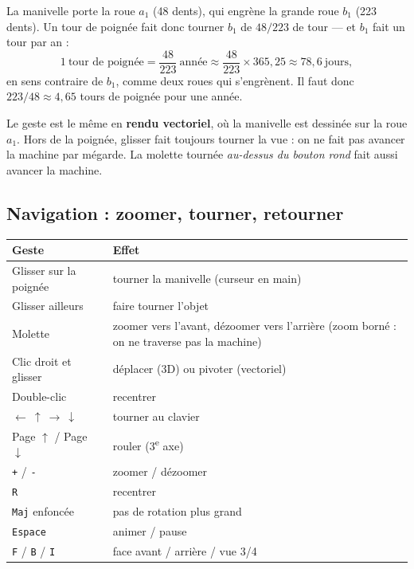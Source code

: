 \documentclass[a4paper,11pt]{article}
\begin{document}
\begin{info}
La manivelle porte la roue $a_1$ (48 dents), qui engrène la grande roue $b_1$
(223 dents). Un tour de poignée fait donc tourner $b_1$ de $48/223$ de tour —
et $b_1$ fait un tour par an :
\[
  1~\text{tour de poignée} = \frac{48}{223}~\text{année}
  \approx \frac{48}{223}\times 365{,}25 \approx 78{,}6~\text{jours},
\]
en sens contraire de $b_1$, comme deux roues qui s'engrènent. Il faut donc
$223/48 \approx 4{,}65$ tours de poignée pour une année.
\end{info}

Le geste est le même en \textbf{rendu vectoriel}, où la manivelle est dessinée
sur la roue $a_1$. Hors de la poignée, glisser fait toujours tourner la vue :
on ne fait pas avancer la machine par mégarde. La molette tournée
\emph{au-dessus du bouton rond} fait aussi avancer la machine.

\subsection{Navigation : zoomer, tourner, retourner}

\begin{center}
\begin{tabularx}{\textwidth}{@{}p{5.2cm}X@{}}
\toprule
\rowcolor{lightblue}\textbf{Geste} & \textbf{Effet} \\
\midrule
Glisser sur la poignée & tourner la manivelle (curseur en main) \\
Glisser ailleurs & faire tourner l'objet \\
Molette & zoomer vers l'avant, dézoomer vers l'arrière (zoom borné : on ne
traverse pas la machine) \\
Clic droit et glisser & déplacer (3D) ou pivoter (vectoriel) \\
Double-clic & recentrer \\
$\leftarrow\ \uparrow\ \rightarrow\ \downarrow$ & tourner au clavier \\
Page $\uparrow$ / Page $\downarrow$ & rouler (3\textsuperscript{e} axe) \\
\texttt{+} / \texttt{-} & zoomer / dézoomer \\
\texttt{R} & recentrer \\
\texttt{Maj} enfoncée & pas de rotation plus grand \\
\texttt{Espace} & animer / pause \\
\texttt{F} / \texttt{B} / \texttt{I} & face avant / arrière / vue 3/4 \\
\bottomrule
\end{tabularx}
\end{center}
\end{document}
